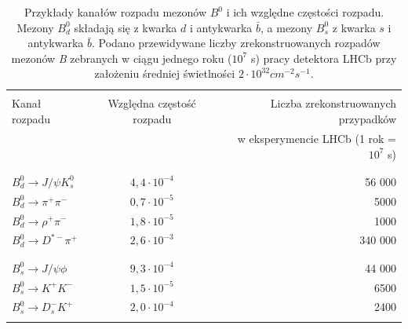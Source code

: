 \documentclass{pracamgr}
\begin{document}
\begin{table}[h!]
\centering
 \caption{Przykłady kanałów rozpadu mezonów $B^{0}$ i ich względne częstości rozpadu. Mezony $B^{0}_{d}$ składają się z kwarka $d$ i antykwarka $\bar{b}$, a mezony $B^{0}_{s}$ z kwarka $s$ i antykwarka $\bar{b}$. Podano przewidywane liczby zrekonstruowanych rozpadów mezonów \textit{B} zebranych w ciągu jednego roku ($10^7$ s) pracy detektora LHCb przy założeniu średniej świetlności $2\cdot 10^{32} cm^{-2}s^{-1}$.}
 \vspace{5pt}
 \begin{tabular}{lcr}
  \hline\hline
   & & \\
  Kanał rozpadu & \hspace{5pt} Względna częstość rozpadu & Liczba zrekonstruowanych przypadków \\
   & & w eksperymencie LHCb (1 rok = $10^{7}$ s)\\
   & & \\
  \hline
   & & \\ 
  $B^{0}_{d}\rightarrow J/\psi K^{0}_{s}$ & $4,4\cdot 10^{-4}$ & 56 000\hspace{80pt} \\
  $B^{0}_{d}\rightarrow \pi^{+}\pi^{-}$ & $0,7\cdot 10^{-5}$ & 5000\hspace{80pt} \\
  $B^{0}_{d}\rightarrow \rho^{+}\pi^{-}$ & $1,8\cdot 10^{-5}$ & 1000\hspace{80pt} \\
  $B^{0}_{d}\rightarrow D^{*-}\pi^{+}$ & $2,6\cdot 10^{-3}$ & 340 000\hspace{80pt} \\
   & & \\
  \hline
   & & \\
  $B^{0}_{s}\rightarrow J/\psi \phi$ & $9,3\cdot 10^{-4}$ & 44 000\hspace{80pt} \\
  $B^{0}_{s}\rightarrow K^{+}K^{-}$ & $1,5\cdot 10^{-5}$ & 6500\hspace{80pt} \\
  $B^{0}_{s}\rightarrow D^{-}_{s}K^{+}$ & $2,0\cdot 10^{-4}$ & 2400\hspace{80pt} \\
   & & \\
  \hline\hline
 \end{tabular}
\end{table}
\end{document}

